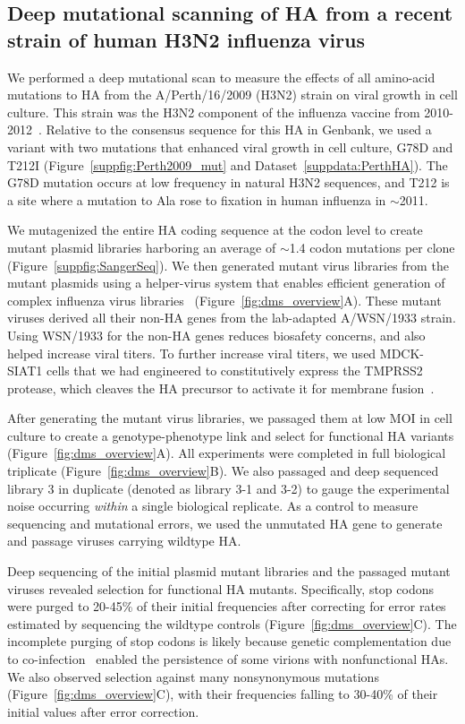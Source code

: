 \documentclass[9pt,twocolumn,twoside]{pnas-new}
\begin{document}
\subsection*{Deep mutational scanning of HA from a recent strain of human H3N2 influenza virus}
We performed a deep mutational scan to measure the effects of all amino-acid mutations to HA from the A/Perth/16/2009 (H3N2) strain on viral growth in cell culture.
This strain was the H3N2 component of the influenza vaccine from 2010-2012~\cite{who2010d,who2011}.
Relative to the consensus sequence for this HA in Genbank, we used a variant with two mutations that enhanced viral growth in cell culture, G78D and T212I (Figure~\ref{suppfig:Perth2009_mut} and Dataset~\ref{suppdata:PerthHA}).
The G78D mutation occurs at low frequency in natural H3N2 sequences, and T212 is a site where a mutation to Ala rose to fixation in human influenza in $\sim$2011.

We mutagenized the entire HA coding sequence at the codon level to create mutant plasmid libraries harboring an average of $\sim$1.4 codon mutations per clone (Figure~\ref{suppfig:SangerSeq}).
We then generated mutant virus libraries from the mutant plasmids using a helper-virus system that enables efficient generation of complex influenza virus libraries~\cite{doud2016accurate} (Figure~\ref{fig:dms_overview}A).
These mutant viruses derived all their non-HA genes from the lab-adapted A/WSN/1933 strain.
Using WSN/1933 for the non-HA genes reduces biosafety concerns, and also helped increase viral titers.
To further increase viral titers, we used MDCK-SIAT1 cells that we had engineered to constitutively express the TMPRSS2 protease, which cleaves the HA precursor to activate it for membrane fusion~\cite{bottcher2006proteolytic, bottcher2010cleavage}.

After generating the mutant virus libraries, we passaged them at low MOI in cell culture to create a genotype-phenotype link and select for functional HA variants (Figure~\ref{fig:dms_overview}A).
All experiments were completed in full biological triplicate (Figure~\ref{fig:dms_overview}B).
We also passaged and deep sequenced library 3 in duplicate (denoted as library 3-1 and 3-2) to gauge the experimental noise occurring \textit{within} a single biological replicate.
As a control to measure sequencing and mutational errors, we used the unmutated HA gene to generate and passage viruses carrying wildtype HA.

Deep sequencing of the initial plasmid mutant libraries and the passaged mutant viruses revealed selection for functional HA mutants.
Specifically, stop codons were purged to 20-45\% of their initial frequencies after correcting for error rates estimated by sequencing the wildtype controls (Figure~\ref{fig:dms_overview}C).
The incomplete purging of stop codons is likely because genetic complementation due to co-infection~\cite{marshall2013influenza} enabled the persistence of some virions with nonfunctional HAs.
We also observed selection against many nonsynonymous mutations (Figure~\ref{fig:dms_overview}C), with their frequencies falling to 30-40\% of their initial values after error correction.
\end{document}
